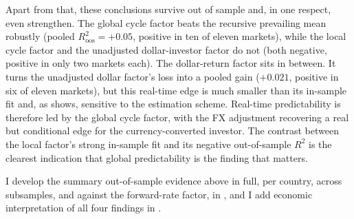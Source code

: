 Apart from that, these conclusions survive out of sample and, in one respect, even
strengthen. The global cycle factor beats the recursive prevailing mean robustly (pooled $R^{2}_{\mathrm{oos}}=+0.05$, positive in ten of eleven
markets), while the local cycle factor and the unadjusted dollar-investor
factor do not (both negative, positive in only two markets each). The
dollar-return factor sits in between. It turns the unadjusted dollar factor's
loss into a pooled gain ($+0.021$, positive in six of eleven markets), but
this real-time edge is much smaller than its in-sample fit and, as
 shows, sensitive to the estimation scheme. Real-time
predictability is therefore led by the global cycle factor, with the FX
adjustment recovering a real but conditional edge for the currency-converted
investor. The contrast between the local factor's strong in-sample fit and its
negative out-of-sample $R^{2}$ is the clearest indication that global
predictability is the finding that matters.

I develop the summary out-of-sample evidence above in full, per country, across
subsamples, and against the forward-rate factor, in , and I
add economic interpretation of all four findings in .
